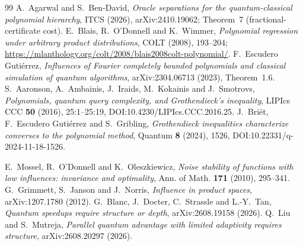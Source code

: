\documentclass[11pt]{article}
\numberwithin{equation}{section}
\theoremstyle{remark}
\begin{document}
\begin{thebibliography}{99}
 A.~Agarwal and S.~Ben-David, \emph{Oracle separations for the quantum-classical polynomial hierarchy}, ITCS (2026), arXiv:2410.19062; Theorem~7 (fractional-certificate cost).
 E.~Blais, R.~O'Donnell and K.~Wimmer, \emph{Polynomial regression under arbitrary product distributions}, COLT (2008), 193--204; \url{https://mlanthology.org/colt/2008/blais2008colt-polynomial/}.
 F.~Escudero Guti\'errez, \emph{Influences of Fourier completely bounded polynomials and classical simulation of quantum algorithms}, arXiv:2304.06713 (2023), Theorem~1.6.
 S.~Aaronson, A.~Ambainis, J.~Iraids, M.~Kokainis and J.~Smotrovs,
\emph{Polynomials, quantum query complexity, and Grothendieck's inequality},
LIPIcs CCC \textbf{50} (2016), 25:1--25:19, DOI:10.4230/LIPIcs.CCC.2016.25.
 J.~Bri\"et, F.~Escudero Guti\'errez and S.~Gribling,
\emph{Grothendieck inequalities characterize converses to the polynomial method},
Quantum \textbf{8} (2024), 1526, DOI:10.22331/q-2024-11-18-1526.


 E.~Mossel, R.~O'Donnell and K.~Oleszkiewicz,
 \emph{Noise stability of functions with low influences: invariance and optimality},
 Ann. of Math. \textbf{171} (2010), 295--341.
 G.~Grimmett, S.~Janson and J.~Norris,
 \emph{Influence in product spaces}, arXiv:1207.1780 (2012).
 G.~Blanc, J.~Docter, C.~Strassle and L.-Y.~Tan,
 \emph{Quantum speedups require structure or depth}, arXiv:2608.19158 (2026).
 Q.~Liu and S.~Mutreja,
 \emph{Parallel quantum advantage with limited adaptivity requires structure},
 arXiv:2608.20297 (2026).


\end{thebibliography}
\end{document}
